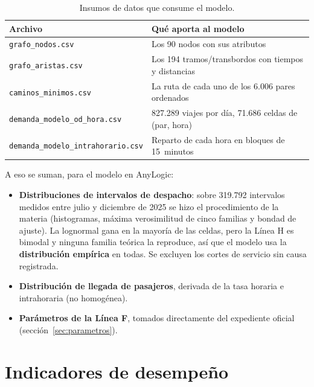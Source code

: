 \documentclass{article}
\begin{document}
\begin{table}[H]
\centering
\small
\begin{tabular}{@{}L{5.3cm}L{8.2cm}@{}}
\toprule
Archivo & Qué aporta al modelo \\
\midrule
\texttt{grafo\_nodos.csv} & Los 90 nodos con sus atributos \\
\texttt{grafo\_aristas.csv} & Los 194 tramos/transbordos con tiempos y distancias \\
\texttt{caminos\_minimos.csv} & La ruta de cada uno de los 6.006 pares ordenados \\
\texttt{demanda\_modelo\_\allowbreak od\_hora.csv} & 827.289 viajes por día, 71.686 celdas de
  (par, hora) \\
\texttt{demanda\_modelo\_\allowbreak intrahorario.csv} & Reparto de cada hora en bloques de
  15~minutos \\
\bottomrule
\end{tabular}
\caption{Insumos de datos que consume el modelo.}
\end{table}

A eso se suman, para el modelo en AnyLogic:
\begin{itemize}
  \item \textbf{Distribuciones de intervalos de despacho}: sobre 319.792
    intervalos medidos entre julio y diciembre de 2025 se hizo el procedimiento de la materia (histogramas, máxima
    verosimilitud de cinco familias y bondad de ajuste). La lognormal gana en la
    mayoría de las celdas, pero la Línea H es bimodal y ninguna familia teórica la
    reproduce, así que el modelo usa la \textbf{distribución empírica} en todas.
    Se excluyen los cortes de servicio sin causa registrada.
  \item \textbf{Distribución de llegada de pasajeros}, derivada de la tasa horaria e
    intrahoraria (no homogénea).
  \item \textbf{Parámetros de la Línea F}, tomados directamente del expediente
    oficial (sección~\ref{sec:parametros}).
\end{itemize}

\section{Indicadores de desempeño}
\end{document}
